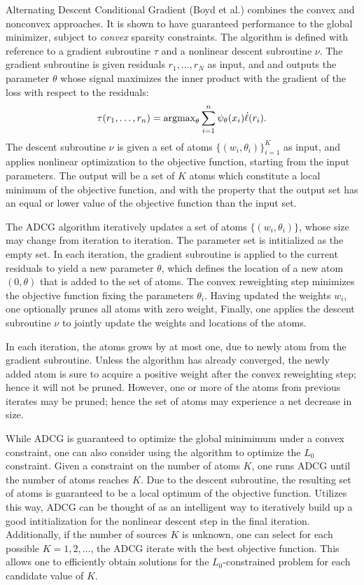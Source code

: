 \documentclass[11pt]{article}
\begin{document}
Alternating Descent Conditional Gradient (Boyd et al.) combines the
convex and nonconvex approaches.  It is shown to have guaranteed
performance to the global minimizer, subject to \emph{convex} sparsity
constraints.  The algorithm is defined with reference to a gradient
subroutine $\tau$ and a nonlinear descent subroutine $\nu$.  The
gradient subroutine is given residuals $r_1,\hdots, r_N$ as input, and
and outputs the parameter $\theta$ whose signal maximizes the inner
product with the gradient of the loss with respect to the residuals:
\[
\tau(r_1,\hdots, r_n) = \text{argmax}_\theta \sum_{i=1}^n \psi_\theta(x_i) \dot{\ell}(r_i).
\]
The descent subroutine $\nu$ is given a set of atoms
$\{(w_i,\theta_i)\}_{i=1}^K$ as input, and applies nonlinear
optimization to the objective function, starting from the input
parameters.  The output will be a set of $K$ atoms
which constitute a local minimum of the objective function, and with
the property that the output set has an equal or lower value of the
objective function than the input set.

The ADCG algorithm iteratively updates a set of atoms $\{(w_i,
\theta_i)\}$, whose size may change from iteration to iteration.  The
parameter set is intitialized as the empty set.  In each iteration,
the gradient subroutine is applied to the current residuals to yield a
new parameter $\theta$, which defines the location of a new atom $(0,
\theta)$ that is added to the set of atoms.  The convex reweighting
step minimizes the objective function fixing the parameters
$\theta_i$.  Having updated the weights $w_i$, one optionally prunes
all atoms with zero weight, Finally, one applies the descent
subroutine $\nu$ to jointly update the weights and locations of the
atoms.

In each iteration, the atoms grows by at most one, due to newly atom
from the gradient subroutine.  Unless the algorithm has already
converged, the newly added atom is sure to acquire a positive weight
after the convex reweighting step; hence it will not be pruned.
However, one or more of the atoms from previous iterates may be
pruned; hence the set of atoms may experience a net decrease in size.

While ADCG is guaranteed to optimize the global minimimum under a
convex constraint, one can also consider using the algorithm to
optimize the $L_0$ constraint.  Given a constraint on the number of
atoms $K$, one runs ADCG until the number of atoms reaches $K$.  Due
to the descent subroutine, the resulting set of atoms is guaranteed to
be a local optimum of the objective function.  Utilizes this way, ADCG
can be thought of as an intelligent way to iteratively build up a good
intitialization for the nonlinear descent step in the final iteration.
Additionally, if the number of sources $K$ is unknown, one can select
for each possible $K=1,2,\hdots$, the ADCG iterate with the best
objective function.  This allows one to efficiently obtain solutions
for the $L_0$-constrained problem for each candidate value of $K$.
\end{document}
